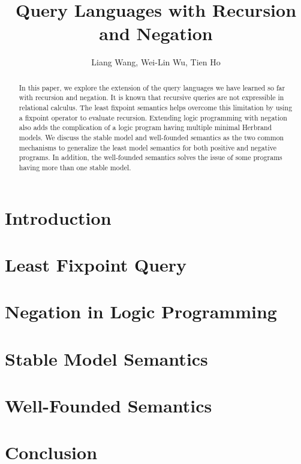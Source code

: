 \documentclass[11pt]{article}
\begin{document}
\title{Query Languages with Recursion and Negation}
\author{Liang Wang, Wei-Lin Wu, Tien Ho}
\maketitle

\begin{abstract}
  \noindent In this paper, we explore the extension of the query languages we have 
  learned so far with recursion and negation. It is known that 
  recursive queries are not expressible in relational calculus. The least 
  fixpoint semantics helps overcome this limitation by using a fixpoint 
  operator to evaluate recursion. Extending logic programming with negation 
  also adds the complication of a logic program having multiple minimal 
  Herbrand models. We discuss the stable model and well-founded semantics 
  as the two common mechanisms to generalize the least model semantics 
  for both positive and negative programs. In addition, the well-founded semantics 
  solves the issue of some programs having more than one stable model.
\end{abstract}

\section{Introduction} 
\section{Least Fixpoint Query} 
\section{Negation in Logic Programming} 
\section{Stable Model Semantics} 
\section{Well-Founded Semantics} 
\section{Conclusion} 
\end{document}
